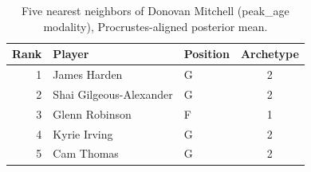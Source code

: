 \begin{table}[htbp]
  \centering\small
  \begin{tabular}{rllc}
    \toprule
    Rank & Player & Position & Archetype \\
    \midrule
    1 & James Harden & G & 2 \\
    2 & Shai Gilgeous-Alexander & G & 2 \\
    3 & Glenn Robinson & F & 1 \\
    4 & Kyrie Irving & G & 2 \\
    5 & Cam Thomas & G & 2 \\
    \bottomrule
  \end{tabular}
  \caption{Five nearest neighbors of Donovan Mitchell (peak_age modality), Procrustes-aligned posterior mean.}
  \label{tab:Donovan_Mitchell_neighbors_peak_age}
\end{table}

